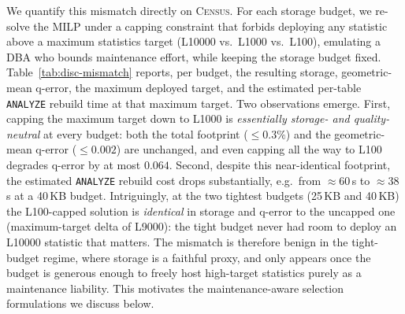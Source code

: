 \documentclass[sigconf, nonacm]{acmart}
\begin{document}
{We quantify this mismatch directly on \textsc{Census}. For each storage budget, we
re-solve the MILP under a capping constraint that forbids deploying any statistic
above a maximum statistics target (L10000 vs.\ L1000 vs.\ L100), emulating a DBA who
bounds maintenance effort, while keeping the storage budget fixed. Table~\ref{tab:disc-mismatch}
reports, per budget, the resulting storage, geometric-mean q-error, the maximum
deployed target, and the estimated per-table \texttt{ANALYZE} rebuild time at that
maximum target. Two observations emerge. First, capping the maximum target down to
L1000 is \textit{essentially storage- and quality-neutral} at every budget: both the
total footprint (${\le}0.3\%$) and the geometric-mean q-error (${\le}0.002$) are
unchanged, and even capping all the way to L100 degrades q-error by at most $0.064$.
Second, despite this near-identical footprint,
the estimated \texttt{ANALYZE} rebuild cost drops substantially, e.g.\ from
$\approx\!60$\,s to $\approx\!38$\,s at a 40\,KB budget. Intriguingly, at the two
tightest budgets (25\,KB and 40\,KB) the L100-capped solution is \textit{identical} in
storage and q-error to the uncapped one (maximum-target delta of L9000): the tight
budget never had room to deploy an L10000 statistic that matters. The mismatch is
therefore benign in the tight-budget regime, where storage is a faithful proxy, and
only appears once the budget is generous enough to freely host high-target statistics
purely as a maintenance liability. This motivates the maintenance-aware selection
formulations we discuss below.}
\end{document}
